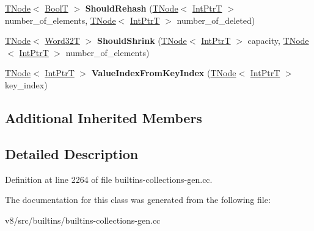 \begin{DoxyCompactItemize}
\item 
\mbox{\label{classv8_1_1internal_1_1WeakCollectionsBuiltinsAssembler_af2283dbb2e07fb8d6a755897183ad390}} 
\mbox{\hyperlink{classv8_1_1internal_1_1compiler_1_1TNode}{T\+Node}}$<$ \mbox{\hyperlink{structv8_1_1internal_1_1BoolT}{BoolT}} $>$ {\bfseries Should\+Rehash} (\mbox{\hyperlink{classv8_1_1internal_1_1compiler_1_1TNode}{T\+Node}}$<$ \mbox{\hyperlink{structv8_1_1internal_1_1IntPtrT}{Int\+PtrT}} $>$ number\+\_\+of\+\_\+elements, \mbox{\hyperlink{classv8_1_1internal_1_1compiler_1_1TNode}{T\+Node}}$<$ \mbox{\hyperlink{structv8_1_1internal_1_1IntPtrT}{Int\+PtrT}} $>$ number\+\_\+of\+\_\+deleted)
\item 
\mbox{\label{classv8_1_1internal_1_1WeakCollectionsBuiltinsAssembler_aa60f6016e45117bfaca2834eb6543db6}} 
\mbox{\hyperlink{classv8_1_1internal_1_1compiler_1_1TNode}{T\+Node}}$<$ \mbox{\hyperlink{structv8_1_1internal_1_1Word32T}{Word32T}} $>$ {\bfseries Should\+Shrink} (\mbox{\hyperlink{classv8_1_1internal_1_1compiler_1_1TNode}{T\+Node}}$<$ \mbox{\hyperlink{structv8_1_1internal_1_1IntPtrT}{Int\+PtrT}} $>$ capacity, \mbox{\hyperlink{classv8_1_1internal_1_1compiler_1_1TNode}{T\+Node}}$<$ \mbox{\hyperlink{structv8_1_1internal_1_1IntPtrT}{Int\+PtrT}} $>$ number\+\_\+of\+\_\+elements)
\item 
\mbox{\label{classv8_1_1internal_1_1WeakCollectionsBuiltinsAssembler_aaa40e4281df6d8de393a8e0d1383ec1c}} 
\mbox{\hyperlink{classv8_1_1internal_1_1compiler_1_1TNode}{T\+Node}}$<$ \mbox{\hyperlink{structv8_1_1internal_1_1IntPtrT}{Int\+PtrT}} $>$ {\bfseries Value\+Index\+From\+Key\+Index} (\mbox{\hyperlink{classv8_1_1internal_1_1compiler_1_1TNode}{T\+Node}}$<$ \mbox{\hyperlink{structv8_1_1internal_1_1IntPtrT}{Int\+PtrT}} $>$ key\+\_\+index)
\end{DoxyCompactItemize}
\subsection*{Additional Inherited Members}


\subsection{Detailed Description}


Definition at line 2264 of file builtins-\/collections-\/gen.\+cc.



The documentation for this class was generated from the following file\+:\begin{DoxyCompactItemize}
\item 
v8/src/builtins/builtins-\/collections-\/gen.\+cc\end{DoxyCompactItemize}
